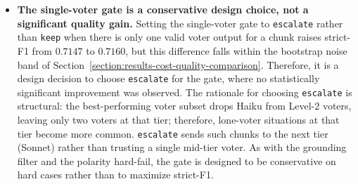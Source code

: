\begin{itemize}[label={},leftmargin=1.5em]
    \item \textbf{The single-voter gate is a conservative design choice, not a significant quality gain.} Setting the single-voter gate to \texttt{escalate} rather than \texttt{keep} when there is only one valid voter output for a chunk raises strict-F1 from $0.7147$ to $0.7160$, but this difference falls within the bootstrap noise band of Section~\ref{section:results-cost-quality-comparison}. Therefore, it is a design decision to choose \texttt{escalate} for the gate, where no statistically significant improvement was observed. The rationale for choosing \texttt{escalate} is structural: the best-performing voter subset drops Haiku from Level-2 voters, leaving only two voters at that tier; therefore, lone-voter situations at that tier become more common. \texttt{escalate} sends such chunks to the next tier (Sonnet) rather than trusting a single mid-tier voter. As with the grounding filter and the polarity hard-fail, the gate is designed to be conservative on hard cases rather than to maximize strict-F1.

\end{itemize}